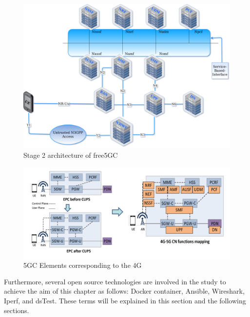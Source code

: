     \begin{figure}
\centering
\includegraphics[scale=0.25]{images/Stage2_architecture_of_free5GC.png}
\caption{Stage 2 architecture of free5GC\cite{Free5gc2019}}
\label{fig:Stage2_architecture_of_free5GC}
\end{figure}
    
    
    
\begin{figure}
\centering
\includegraphics[scale=0.28]{images/oai_epc_core5G1.png}
\caption{5GC Elements corresponding to the 4G \cite{openairinterface2014}}
\label{fig:oai_epc_core5G1}
\end{figure}

    
    
    
    
    
Furthermore, several open source technologies are involved in the study to achieve the aim of this chapter as follows: Docker container, Ansible, Wireshark, Iperf, and dsTest. These terms will be explained in this section and the following sections.


